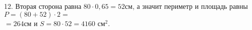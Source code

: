 12. Вторая сторона равна $80\cdot0,65=52$см, а значит периметр и площадь равны $P=(80+52)\cdot2=$\\$=264$см и $S=80\cdot52=4160\text{ см}^2.$\\
